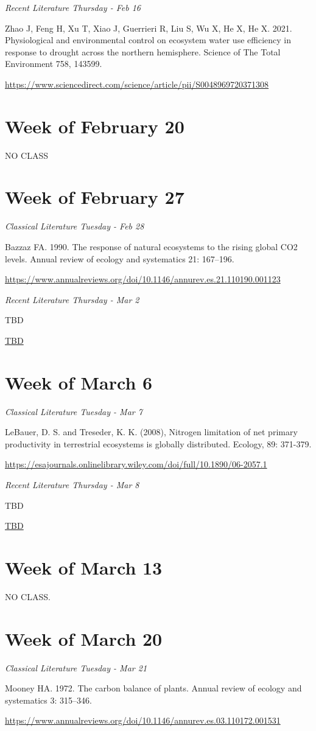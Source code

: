 \documentclass[12pt, notitlepage]{article}   	%
\begin{document}
{\textit{Recent Literature Thursday - Feb 16} \par
Zhao J, Feng H, Xu T, Xiao J, Guerrieri R, Liu S, Wu X, He X, He X. 2021. 
Physiological and environmental control on ecosystem water use efficiency 
in response to drought across the northern hemisphere. Science of The Total Environment 758, 143599. \par
\url{https://www.sciencedirect.com/science/article/pii/S0048969720371308}

\section*{Week of February 20}
NO CLASS

\section*{Week of February 27}
\textit{Classical Literature Tuesday - Feb 28} \par
Bazzaz FA. 1990. The response of natural ecosystems to the rising global CO2 levels. 
Annual review of ecology and systematics 21: 167–196. \par
\url{https://www.annualreviews.org/doi/10.1146/annurev.es.21.110190.001123}

\textit{Recent Literature Thursday - Mar 2} \par
TBD \par
\url{TBD}

\section*{Week of March 6}
\textit{Classical Literature Tuesday - Mar 7} \par
LeBauer, D. S. and Treseder, K. K. (2008), Nitrogen limitation of net primary productivity
in terrestrial ecosystems is globally distributed. Ecology, 89: 371-379. \par
\url{https://esajournals.onlinelibrary.wiley.com/doi/full/10.1890/06-2057.1}

\textit{Recent Literature Thursday - Mar 8} \par
TBD \par
\url{TBD}

\section*{Week of March 13}
NO CLASS.

\section*{Week of March 20}
\textit{Classical Literature Tuesday - Mar 21} \par
Mooney HA. 1972. The carbon balance of plants. 
Annual review of ecology and systematics 3: 315–346. \par
\url{https://www.annualreviews.org/doi/10.1146/annurev.es.03.110172.001531}

}
\end{document}
